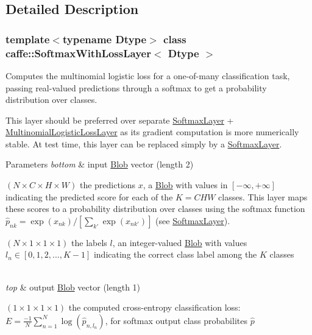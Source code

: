 \subsection{Detailed Description}
\subsubsection*{template$<$typename Dtype$>$\newline
class caffe\+::\+Softmax\+With\+Loss\+Layer$<$ Dtype $>$}

Computes the multinomial logistic loss for a one-\/of-\/many classification task, passing real-\/valued predictions through a softmax to get a probability distribution over classes. 

This layer should be preferred over separate \mbox{\hyperlink{classcaffe_1_1_softmax_layer}{Softmax\+Layer}} + \mbox{\hyperlink{classcaffe_1_1_multinomial_logistic_loss_layer}{Multinomial\+Logistic\+Loss\+Layer}} as its gradient computation is more numerically stable. At test time, this layer can be replaced simply by a \mbox{\hyperlink{classcaffe_1_1_softmax_layer}{Softmax\+Layer}}.


\begin{DoxyParams}{Parameters}
{\em bottom} & input \mbox{\hyperlink{classcaffe_1_1_blob}{Blob}} vector (length 2)
\begin{DoxyEnumerate}
\item $ (N \times C \times H \times W) $ the predictions $ x $, a \mbox{\hyperlink{classcaffe_1_1_blob}{Blob}} with values in $ [-\infty, +\infty] $ indicating the predicted score for each of the $ K = CHW $ classes. This layer maps these scores to a probability distribution over classes using the softmax function $ \hat{p}_{nk} = \exp(x_{nk}) / \left[\sum_{k'} \exp(x_{nk'})\right] $ (see \mbox{\hyperlink{classcaffe_1_1_softmax_layer}{Softmax\+Layer}}).
\item $ (N \times 1 \times 1 \times 1) $ the labels $ l $, an integer-\/valued \mbox{\hyperlink{classcaffe_1_1_blob}{Blob}} with values $ l_n \in [0, 1, 2, ..., K - 1] $ indicating the correct class label among the $ K $ classes 
\end{DoxyEnumerate}\\
\hline
{\em top} & output \mbox{\hyperlink{classcaffe_1_1_blob}{Blob}} vector (length 1)
\begin{DoxyEnumerate}
\item $ (1 \times 1 \times 1 \times 1) $ the computed cross-\/entropy classification loss\+: $ E = \frac{-1}{N} \sum\limits_{n=1}^N \log(\hat{p}_{n,l_n}) $, for softmax output class probabilites $ \hat{p} $ 
\end{DoxyEnumerate}\\
\hline
\end{DoxyParams}


